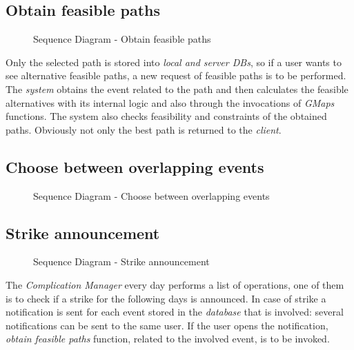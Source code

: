 \subsection{Obtain feasible paths}
	\begin{figure}[H]
		\noindent{}
		\caption{Sequence Diagram - Obtain feasible paths}
	\end{figure}
		Only the selected path is stored into \textit{local and server DBs}, so if a user wants to see alternative feasible paths, a new request of feasible paths is to be performed. 
		The \textit{system} obtains the event related to the path and then calculates the feasible alternatives with its internal logic and also through the invocations of \textit{GMaps} functions. The system also checks feasibility and constraints of the obtained paths. Obviously not only the best path is returned to the \textit{client}.
\subsection{Choose between overlapping events}
	\begin{figure}[H]
		\noindent{}
		\caption{Sequence Diagram - Choose between overlapping events}
	\end{figure}
\subsection{Strike announcement}
	\begin{figure}[H]
		\noindent{}
		\caption{Sequence Diagram - Strike announcement}
	\end{figure}
		The \textit{Complication Manager} every day performs a list of operations, one of them is to check if a strike for the following days is announced. 
		In case of strike a notification is sent for each event stored in the \textit{database} that is involved: several notifications can be sent to the same user. 
		If the user opens the notification, \textit{obtain feasible paths} function, related to the involved event, is to be invoked.